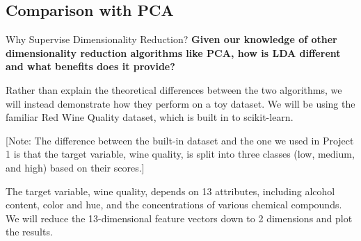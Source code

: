 \documentclass[9pt]{beamer}
\begin{document}
\subsection{Comparison with PCA}
\frame{\subsectionpage}
\begin{frame}{Why Supervise Dimensionality Reduction?}
    \textbf{Given our knowledge of other dimensionality reduction algorithms like PCA, how is LDA different and what benefits does it provide?}
    
    Rather than explain the theoretical differences between the two algorithms, we will instead demonstrate how they perform on a toy dataset. We will be using the familiar Red Wine Quality dataset, which is built in to scikit-learn. 
    
    \footnotesize
    [Note: The difference between the built-in dataset and the one we used in Project 1 is that the target variable, wine quality, is split into three classes (low, medium, and high) based on their scores.]
    \normalsize
    
    The target variable, wine quality, depends on 13 attributes, including alcohol content, color and hue, and the concentrations of various chemical compounds. We will reduce the 13-dimensional feature vectors down to 2 dimensions and plot the results.
\end{frame}
\end{document}

